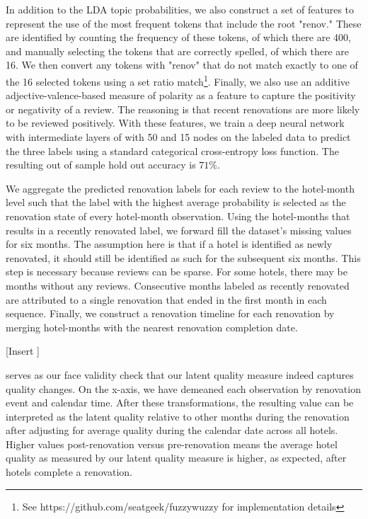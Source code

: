 \documentclass[mksc,blindrev]{informs3} %
\begin{document}
In addition to the LDA topic probabilities, we also construct a set of features to represent the use of the most frequent tokens that include the root "renov." These are identified by counting the frequency of these tokens, of which there are 400, and manually selecting the tokens that are correctly spelled, of which there are 16. We then convert any tokens with "renov" that do not match exactly to one of the 16 selected tokens using a set ratio match\footnote{See https://github.com/seatgeek/fuzzywuzzy for implementation details}. Finally, we also use an additive adjective-valence-based measure of polarity as a feature to capture the positivity or negativity of a review. The reasoning is that recent renovations are more likely to be reviewed positively. With these features, we train a deep neural network with intermediate layers of with 50 and 15 nodes on the labeled data to predict the three labels using a standard categorical cross-entropy loss function. The resulting out of sample hold out accuracy is $71\%$. 

We aggregate the predicted renovation labels for each review to the hotel-month level such that the label with the highest average probability is selected as the renovation state of every hotel-month observation. Using the hotel-months that results in a recently renovated label, we forward fill the dataset's missing values for six months. The assumption here is that if a hotel is identified as newly renovated, it should still be identified as such for the subsequent six months. This step is necessary because reviews can be sparse. For some hotels, there may be months without any reviews. Consecutive months labeled as recently renovated are attributed to a single renovation that ended in the first month in each sequence. Finally, we construct a renovation timeline for each renovation by merging hotel-months with the nearest renovation completion date. 

[Insert ]

 serves as our face validity check that our latent quality measure indeed captures quality changes. On the x-axis, we have demeaned each observation by renovation event and calendar time. After these transformations, the resulting value can be interpreted as the latent quality relative to other months during the renovation after adjusting for average quality during the calendar date across all hotels. Higher values post-renovation versus pre-renovation means the average hotel quality as measured by our latent quality measure is higher, as expected, after hotels complete a renovation. 
\end{document}
